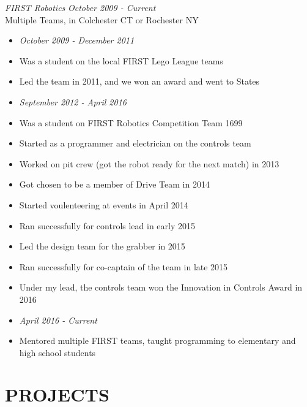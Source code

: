 \documentclass[line,margin]{res}
\begin{document}
\begin{resume}
	{\sl FIRST Robotics} \hfill {\sl October 2009 - Current}\\
		Multiple Teams, in Colchester CT or Rochester NY
		\begin{itemize}
			\itemsep -2pt
			\item \textit{October 2009 - December 2011} 
			\item Was a student on the local FIRST Lego League teams 
			\item Led the team in 2011, and we won an award and went to States
			\item \textit{September 2012 - April 2016}
			\item Was a student on FIRST Robotics Competition Team 1699
			\item Started as a programmer and electrician on the controls team
			\item Worked on pit crew (got the robot ready for the next match) in 2013
			\item Got chosen to be a member of Drive Team in 2014
			\item Started voulenteering at events in April 2014
			\item Ran successfully for controls lead in early 2015
			\item Led the design team for the grabber in 2015
			\item Ran successfully for co-captain of the team in late 2015
			\item Under my lead, the controls team won the Innovation in Controls Award in 2016
			\item \textit{April 2016 - Current}
			\item Mentored multiple FIRST teams, taught programming to elementary and high school students
		\end{itemize}

\section{PROJECTS}
	

\end{resume}
\end{document}
